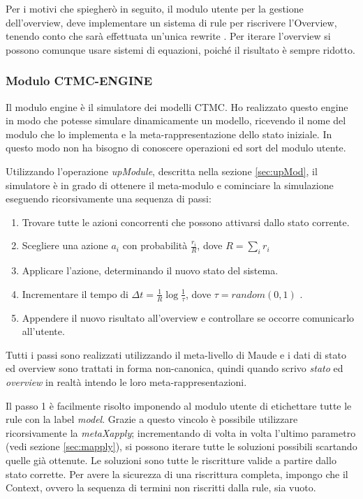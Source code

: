 Per i motivi che spiegherò in seguito, il modulo utente per la gestione
dell'overview, deve implementare un sistema di rule per riscrivere l'Overview,
tenendo conto che sarà effettuata un'unica rewrite . Per iterare l'overview si
possono comunque usare sistemi di equazioni, poiché il risultato è sempre
ridotto.

\subsubsection{Modulo CTMC-ENGINE}
\label{sec:CTMC-ENGINE}

Il modulo engine è il simulatore dei modelli CTMC. Ho realizzato questo engine
in modo che potesse simulare dinamicamente un modello, ricevendo il nome del
modulo che lo implementa e la meta-rappresentazione dello stato iniziale. In
questo modo non ha bisogno di conoscere operazioni ed sort del modulo
utente.

Utilizzando l'operazione \emph{upModule}, descritta nella sezione
\ref{sec:upMod}, il simulatore è in grado di ottenere il meta-modulo e
cominciare la simulazione eseguendo ricorsivamente una sequenza di passi:

\begin{enumerate}
  \item Trovare tutte le azioni concorrenti che possono attivarsi dallo stato
  corrente.
  \item Scegliere una azione $a_i$ con probabilità $\frac{r_i}{R}$, dove $R =
  \sum_i{r_i}$
  \item Applicare l'azione, determinando il nuovo stato del sistema.
  \item Incrementare il tempo di $\Delta{}t = \frac{1}{R}\log{\frac{1}{\tau}}$,
  dove $\tau = random(0, 1)$ .
  \item Appendere il nuovo risultato all'overview e controllare se occorre
  comunicarlo all'utente.
\end{enumerate}

Tutti i passi sono realizzati utilizzando il meta-livello di Maude e i dati di
stato ed overview sono trattati in forma non-canonica, quindi quando scrivo
\emph{stato} ed \emph{overview} in realtà intendo le loro meta-rappresentazioni.

Il passo 1 è facilmente risolto imponendo al modulo utente di etichettare tutte
le rule con la label \emph{model}. Grazie a questo vincolo è possibile
utilizzare ricorsivamente la \emph{metaXapply}; incrementando di volta in volta
l'ultimo parametro (vedi sezione \ref{sec:mapply}), si possono iterare tutte le
soluzioni possibili scartando quelle già ottenute. Le soluzioni sono tutte le
riscritture valide a partire dallo stato corrette. Per avere la sicurezza di una
riscrittura completa, impongo che il Context, ovvero la sequenza di termini non
riscritti dalla rule, sia vuoto.

